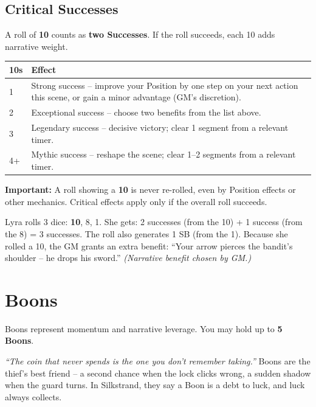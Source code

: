 \subsection{Critical Successes}
\label{sec:critical-success}

A roll of \textbf{10} counts as \textbf{two Successes}. If the roll succeeds, each 10 adds narrative weight.

\begin{center}
\begin{tabular}{ll}
\toprule
\textbf{10s} & \textbf{Effect} \\
\midrule
1 & Strong success -- improve your Position by one step on your next action this scene, or gain a minor advantage (GM's discretion). \\
2 & Exceptional success -- choose two benefits from the list above. \\
3 & Legendary success -- decisive victory; clear 1 segment from a relevant timer. \\
4+ & Mythic success -- reshape the scene; clear 1--2 segments from a relevant timer. \\
\bottomrule
\end{tabular}
\end{center}

\noindent \textbf{Important:} A roll showing a \textbf{10} is never re-rolled, even by Position effects or other mechanics. Critical effects apply only if the overall roll succeeds.

\begin{tcolorbox}[colback=yellow!5!white,colframe=yellow!75!black,title=\textbf{Example: Rolling a 10},breakable]
  Lyra rolls 3 dice: \textbf{10}, 8, 1.  
  She gets: 2 successes (from the 10) + 1 success (from the 8) = 3 successes.  
  The roll also generates 1 SB (from the 1).  
  Because she rolled a 10, the GM grants an extra benefit: ``Your arrow pierces the bandit's shoulder -- he drops his sword.''  
  \textit{(Narrative benefit chosen by GM.)}
\end{tcolorbox}

\section{Boons}
\label{sec:boons}

Boons represent momentum and narrative leverage. You may hold up to \textbf{5 Boons}.

\begin{tcolorbox}[colback=yellow!5!white,colframe=yellow!70!black,title=\textit{Lore of the Velvet Touch},breakable]
\emph{``The coin that never spends is the one you don't remember taking.''}  
Boons are the thief's best friend -- a second chance when the lock clicks wrong, a sudden shadow when the guard turns. In Silkstrand, they say a Boon is a debt to luck, and luck always collects.
\end{tcolorbox}

